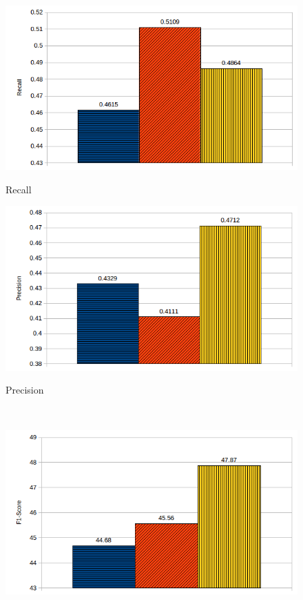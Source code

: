 \begin{figure}[H]
  \begin{minipage}{.5\textwidth}
    \includegraphics[width=\textwidth]{images/baselines_combined_recall.png}
    \centerline{Recall}\medskip
  \end{minipage}\hfill
  \begin{minipage}{.5\textwidth}
    \includegraphics[width=\textwidth]{images/baselines_combined_precision.png}
    \centerline{Precision}\medskip
  \end{minipage}\\
  \begin{minipage}{.5\textwidth}
    \includegraphics[width=\textwidth]{images/baselines_combined_f1score.png}

\end{minipage}
\end{figure}
